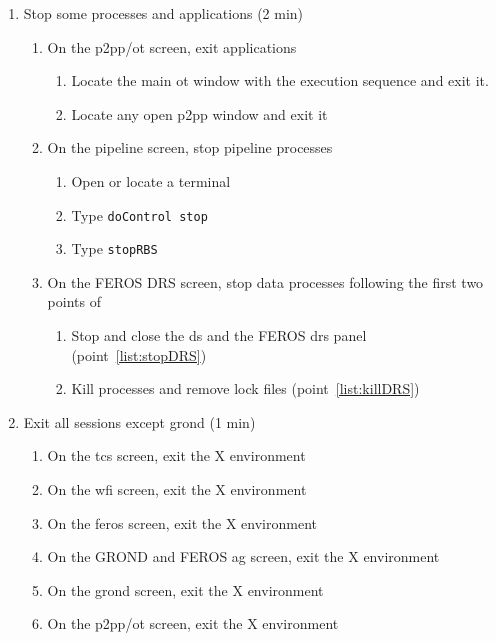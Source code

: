 \documentclass[11pt,fleqn,a4paper]{book}
\begin{document}
\label{proc:monthly}
\begin{enumerate}
\item \label{list:soft:stop} Stop some processes and applications (2 min)
  \begin{enumerate}
     \item On the p2pp/ot screen, exit applications
     \begin{enumerate}
      \item Locate the main \gls{ot} window with the execution sequence and exit it.
      \item Locate any open \gls{p2pp} window and exit it
     \end{enumerate}
     \item On the pipeline screen, stop pipeline processes
             \begin{enumerate}
                \item Open or locate a terminal
                \item Type \texttt{doControl stop}
                \item Type \texttt{stopRBS}
             \end{enumerate}
     \item On the FEROS DRS screen, stop data processes following the first two points of 
             \begin{enumerate}
                \item Stop and close the \gls{ds} and the FEROS \gls{drs} panel (point~\ref{list:stopDRS})
                \item Kill processes and remove lock files (point~\ref{list:killDRS})
             \end{enumerate}
   \end{enumerate}
\item \label{list:soft:exit} Exit all sessions except \gls{grond} (1 min)
    \begin{enumerate}
        \item On the \gls{tcs} screen, exit the X environment
        \item On the \gls{wfi} screen, exit the X environment
        \item On the \gls{feros} screen, exit the X environment
        \item On the GROND and FEROS \gls{ag} screen, exit the X environment
        \item On the \gls{grond} screen, exit the X environment
        \item On the p2pp/ot screen, exit the X environment

\end{enumerate}
\end{enumerate}
\end{document}
